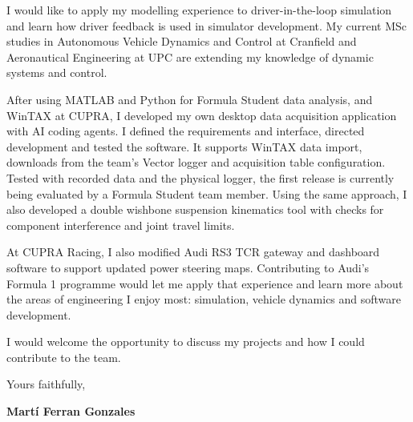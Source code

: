 \documentclass[a4paper,11pt]{article}
\begin{document}
I would like to apply my modelling experience to driver-in-the-loop simulation and learn how driver feedback is used in simulator development. My current MSc studies in Autonomous Vehicle Dynamics and Control at Cranfield and Aeronautical Engineering at UPC are extending my knowledge of dynamic systems and control.

After using MATLAB and Python for Formula Student data analysis, and WinTAX at CUPRA, I developed my own desktop data acquisition application with AI coding agents. I defined the requirements and interface, directed development and tested the software. It supports WinTAX data import, downloads from the team’s Vector logger and acquisition table configuration. Tested with recorded data and the physical logger, the first release is currently being evaluated by a Formula Student team member. Using the same approach, I also developed a double wishbone suspension kinematics tool with checks for component interference and joint travel limits.

At CUPRA Racing, I also modified Audi RS3 TCR gateway and dashboard software to support updated power steering maps. Contributing to Audi’s Formula 1 programme would let me apply that experience and learn more about the areas of engineering I enjoy most: simulation, vehicle dynamics and software development.

I would welcome the opportunity to discuss my projects and how I could contribute to the team.

Yours faithfully,\par
\setlength{\parskip}{0pt}
\vspace{12pt}
\nointerlineskip
\textbf{Martí Ferran Gonzales}
\end{document}
